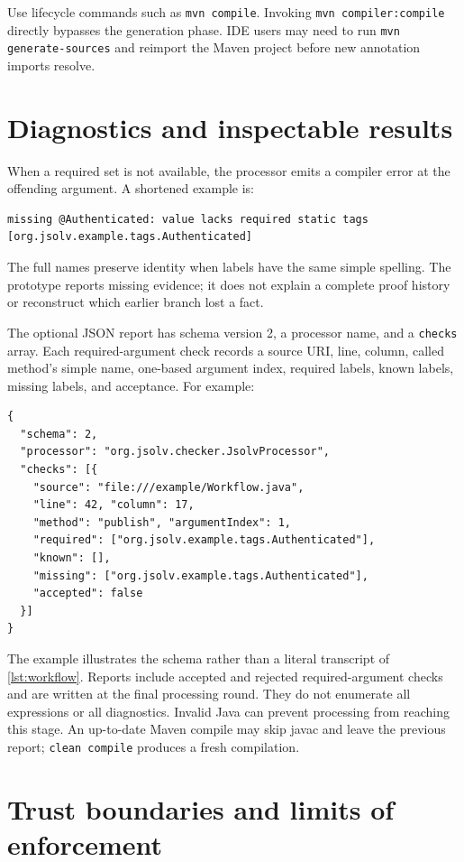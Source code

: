 \documentclass[11pt]{article}
\begin{document}
Use lifecycle commands such as \texttt{mvn compile}. Invoking
\texttt{mvn compiler:compile} directly bypasses the generation phase. IDE users
may need to run \texttt{mvn generate-sources} and reimport the Maven project
before new annotation imports resolve.

\section{Diagnostics and inspectable results}

When a required set is not available, the processor emits a compiler error at
the offending argument. A shortened example is:
\begin{lstlisting}
missing @Authenticated: value lacks required static tags
[org.jsolv.example.tags.Authenticated]
\end{lstlisting}
The full names preserve identity when labels have the same simple spelling.
The prototype reports missing evidence; it does not explain a complete proof
history or reconstruct which earlier branch lost a fact.

The optional JSON report has schema version 2, a processor name, and a
\texttt{checks} array. Each required-argument check records a source URI, line,
column, called method's simple name, one-based argument index, required labels,
known labels, missing labels, and acceptance. For example:
\begin{lstlisting}
{
  "schema": 2,
  "processor": "org.jsolv.checker.JsolvProcessor",
  "checks": [{
    "source": "file:///example/Workflow.java",
    "line": 42, "column": 17,
    "method": "publish", "argumentIndex": 1,
    "required": ["org.jsolv.example.tags.Authenticated"],
    "known": [],
    "missing": ["org.jsolv.example.tags.Authenticated"],
    "accepted": false
  }]
}
\end{lstlisting}
The example illustrates the schema rather than a literal transcript of
\cref{lst:workflow}. Reports include accepted and rejected required-argument
checks and are written at the final processing round. They do not enumerate
all expressions or all diagnostics. Invalid Java can prevent processing from
reaching this stage. An up-to-date Maven compile may skip javac and leave the
previous report; \texttt{clean compile} produces a fresh compilation.

\section{Trust boundaries and limits of enforcement}
\label{sec:limits}
\end{document}
